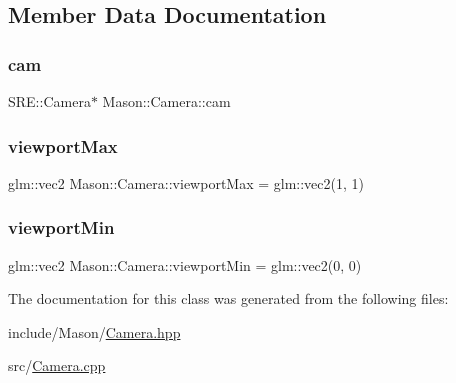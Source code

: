 \subsection{Member Data Documentation}
\hypertarget{class_mason_1_1_camera_a74f870fa866086c21f28f0a1f59254cc}{}\label{class_mason_1_1_camera_a74f870fa866086c21f28f0a1f59254cc} 
\subsubsection{\texorpdfstring{cam}{cam}}
{\footnotesize\ttfamily S\+R\+E\+::\+Camera$\ast$ Mason\+::\+Camera\+::cam\hspace{0.3cm}{\ttfamily [protected]}}

\hypertarget{class_mason_1_1_camera_a8c7510e4c83e123aebbe7bb36da80de9}{}\label{class_mason_1_1_camera_a8c7510e4c83e123aebbe7bb36da80de9} 
\subsubsection{\texorpdfstring{viewport\+Max}{viewportMax}}
{\footnotesize\ttfamily glm\+::vec2 Mason\+::\+Camera\+::viewport\+Max = glm\+::vec2(1, 1)\hspace{0.3cm}{\ttfamily [protected]}}

\hypertarget{class_mason_1_1_camera_a87d7d4111e63ecb41bac7ea33ef270e1}{}\label{class_mason_1_1_camera_a87d7d4111e63ecb41bac7ea33ef270e1} 
\subsubsection{\texorpdfstring{viewport\+Min}{viewportMin}}
{\footnotesize\ttfamily glm\+::vec2 Mason\+::\+Camera\+::viewport\+Min = glm\+::vec2(0, 0)\hspace{0.3cm}{\ttfamily [protected]}}



The documentation for this class was generated from the following files\+:\begin{DoxyCompactItemize}
\item 
include/\+Mason/\hyperlink{_camera_8hpp}{Camera.\+hpp}\item 
src/\hyperlink{_camera_8cpp}{Camera.\+cpp}\end{DoxyCompactItemize}
